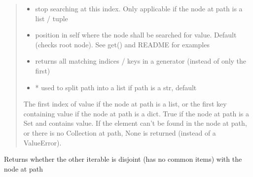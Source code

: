 \documentclass[a4paper,10pt,english]{sphinxmanual}
\begin{document}
\begin{fulllineitems}
\begin{fulllineitems}
\begin{quote}
\begin{description}
\begin{itemize}
\item {}
\sphinxAtStartPar
{} \textendash{} stop searching at this index. Only applicable if the node at path is a list / tuple

\item {}
\sphinxAtStartPar
{} \textendash{} position in self where the node shall be searched for value. Default  (checks root node). See
get() and README for examples

\item {}
\sphinxAtStartPar
{} \textendash{} returns all matching indices / keys in a generator (instead of only the first)

\item {}
\sphinxAtStartPar
{} \textendash{} * used to split path into a list if path is a str, default 

\end{itemize}

\sphinxAtStartPar
The first index of value if the node at path is a list, or the first key containing value if the node at
path is a dict. True if the node at path is a Set and contains value. If the element can’t be found in the
node at path, or there is no Collection at path, None is returned (instead of a ValueError).

\end{description}\end{quote}

\end{fulllineitems}


\begin{fulllineitems}
\label{\detokenize{fagus:fagus.Fagus.isdisjoint}}
\pysigstartsignatures
{}
\pysigstopsignatures
\sphinxAtStartPar
Returns whether the other iterable is disjoint (has no common items) with the node at path


\end{fulllineitems}
\end{fulllineitems}
\end{document}
